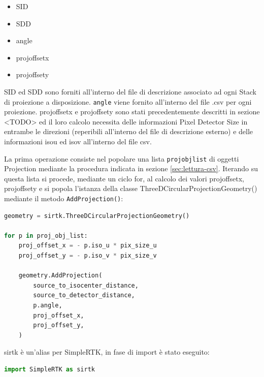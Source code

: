 \documentclass[a4paper,12pt, doubleside]{report}
\begin{document}
                    \begin{itemize}
                        \item SID
                        \item SDD
                        \item angle
                        \item proj\textunderscore offset\textunderscore x
                        \item proj\textunderscore offset\textunderscore y
                    \end{itemize}
                \par
                    SID ed SDD sono forniti all'interno del file di descrizione associato ad ogni Stack di proiezione a disposizione. \texttt{angle} viene fornito all'interno del file .csv per ogni proiezione. 
                    proj\textunderscore offset\textunderscore x e proj\textunderscore offset\textunderscore y sono stati precedentemente descritti in sezione <TODO> ed il loro calcolo necessita delle informazioni Pixel Detector Size in entrambe le direzioni (reperibili all'interno del file di descrizione esterno) e delle informazioni iso\textunderscore u ed iso\textunderscore v all'interno del file csv.
                    
                    La prima operazione consiste nel popolare una lista \texttt{proj\textunderscore obj\textunderscore list} di oggetti Projection mediante la procedura indicata in sezione \ref{sec:lettura-csv}.
                    Iterando su questa lista si procede, mediante un ciclo for, al calcolo dei valori proj\textunderscore offset\textunderscore x, proj\textunderscore offset\textunderscore y e si popola l'istanza della classe ThreeDCircularProjectionGeometry() mediante il metodo \texttt{AddProjection()}:
                
                    \begin{lstlisting}[language=python, frame=bt]
geometry = sirtk.ThreeDCircularProjectionGeometry()

for p in proj_obj_list:
    proj_offset_x = - p.iso_u * pix_size_u
    proj_offset_y = - p.iso_v * pix_size_v

    geometry.AddProjection(
        source_to_isocenter_distance,
        source_to_detector_distance,
        p.angle,
        proj_offset_x,
        proj_offset_y,
    )
                    \end{lstlisting}
                sirtk è un'alias per SimpleRTK, in fase di import è stato eseguito:
                \begin{lstlisting}[language=python, frame=bt]
import SimpleRTK as sirtk
                \end{lstlisting}
                
\end{document}
